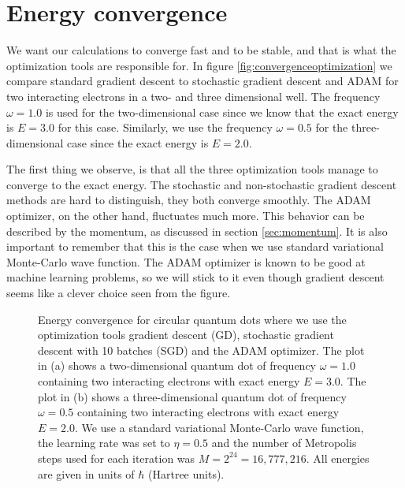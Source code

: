 \section{Energy convergence}
We want our calculations to converge fast and to be stable, and that is what the optimization tools are responsible for. In figure \eqref{fig:convergenceoptimization} we compare standard gradient descent to stochastic gradient descent and ADAM for two interacting electrons in a two- and three dimensional well. The frequency $\omega=1.0$ is used for the two-dimensional case since we know that the exact energy is $E=3.0$ for this case. \cite{taut_two_1993} Similarly, we use the frequency $\omega=0.5$ for the three-dimensional case since the exact energy is $E=2.0$. \cite{taut_two_1994} 

The first thing we observe, is that all the three optimization tools manage to converge to the exact energy. The stochastic and non-stochastic gradient descent methods are hard to distinguish, they both converge smoothly. The ADAM optimizer, on the other hand, fluctuates much more. This behavior can be described by the momentum, as discussed in section \ref{sec:momentum}. It is also important to remember that this is the case when we use standard variational Monte-Carlo wave function. The ADAM optimizer is known to be good at machine learning problems, so we will stick to it even though gradient descent seems like a clever choice seen from the figure. 

\begin{figure}[h]
	\centering 
	\subfloat[2D, $\omega=1.0$]{{}}
	\subfloat[3D, $\omega=0.5$]{{}}
	\caption{Energy convergence for circular quantum dots where we use the optimization tools gradient descent (GD), stochastic gradient descent with 10 batches (SGD) and the ADAM optimizer. The plot in (a) shows a two-dimensional quantum dot of frequency $\omega=1.0$ containing two interacting electrons with exact energy $E=3.0$. The plot in (b) shows a three-dimensional quantum dot of frequency $\omega=0.5$ containing two interacting electrons with exact energy $E=2.0$. We use a standard variational Monte-Carlo wave function, the learning rate was set to $\eta=0.5$ and the number of Metropolis steps used for each iteration was $M=2^{24}=16,777,216$. All energies are given in units of $\hbar$ (Hartree units).}
	\label{fig:convergenceoptimization}
\end{figure} 

